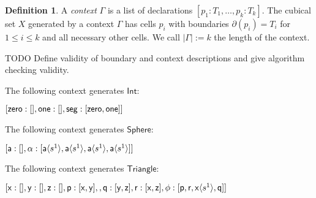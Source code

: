 \documentclass[11pt]{article}
\theoremstyle{definition}
\newtheorem{definition}{Definition}
\newcommand{\continuation}{??}
\newenvironment{examplecontd}[1]
{\renewcommand{\continuation}{\ref{#1}}\expcont[continued]}
{\endexpcont}
\newcommand{\todo}[1]{
  \begin{tcolorbox}
    TODO {#1} 
  \end{tcolorbox}
}
\newcommand{\mdef}{:=}
\newcommand{\mname}[1]{\textit{{#1}}}
\newcommand{\mlist}[1]{[ {#1} ]}
\newcommand{\ctxtdim}[1]{|{#1}|}
\newcommand{\smap}[1]{s^{{#1}}}
\newcommand{\cont}[2]{\ensuremath{ \ifthenelse{\equal{#2}{}}{#1}{{#1}\langle{#2}\rangle}} }
\newcommand{\cset}[1]{\ensuremath{\mathsf{{#1}}}}
\newcommand{\boundary}[1]{\partial({#1})}
\newcommand{\substtwo}[2]{\tiny
  \arraycolsep=.4pt\def\arraystretch{1}
  \begin{array}{ll}
    0 &\mapsto {#1} \\
    1 &\mapsto {#2}
  \end{array}
}
\newcommand{\oneconst}{\smap{1}}
\newcommand{\oneid}{\substtwo{0}{1}}
\begin{document}
\begin{definition}
  A \mname{context} $\Gamma$ is a list of declarations $\mlist{ p_1 : T_1 ,
    \ldots , p_k : T_k}$. The cubical set $X$ generated by a context $\Gamma$
  has cells $p_i$ with boundaries $\boundary{p_i} = T_i$ for $1 \leq i \leq k$
  and all necessary other cells. We call $\ctxtdim{\Gamma} \mdef k$ the length
  of the context.
\end{definition}

\todo{Define validity of boundary and context descriptions and give algorithm
  checking validity.
}

\begin{examplecontd}{exp:int}
  The following context generates $\cset{Int}$:
  
  $\mlist{ \cset{zero} : \mlist{} , \cset{one} : \mlist{} , \cset{seg} : \mlist{
      \cont{\cset{zero}}{}, \cont{\cset{one}}{} }}$
\end{examplecontd}

\begin{examplecontd}{exp:sndsphere}
  The following context generates $\cset{Sphere}$:

  $\mlist{ \cset{a} : \mlist{} , \cset{\alpha} : \mlist{ \cont{\cset{a}}{\oneconst} , \cont{\cset{a}}{\oneconst} ,
  \cont{\cset{a}}{\oneconst}, \cont{\cset{a}}{\oneconst} }}$
  
\end{examplecontd}

\begin{examplecontd}{exp:triangle}
  The following context generates $\cset{Triangle}$:
  

  $\mlist{ \cset{x} : \mlist{} , \cset{y} : \mlist{} , \cset{z} : \mlist{} ,
    \cset{p} : \mlist{ \cset{x}, \cset{y}  } ,
    , \cset{q} : \mlist{ \cset{y}, \cset{z} }
    , \cset{r} : \mlist{ \cset{x}, \cset{z} }
    , \cset{\phi} : \mlist{ \cset{p} , \cset{r} ,
      \cont{\cset{x}}{\oneconst}, \cset{q} }
  }$

\end{examplecontd}
\end{document}
